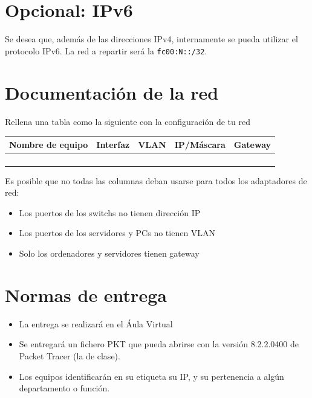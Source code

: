 \section{Opcional: IPv6}
Se desea que, además de las direcciones IPv4, internamente se pueda utilizar el protocolo IPv6. La red a repartir será la \texttt{fc00:N::/32}.

\section{Documentación de la red}
Rellena una tabla como la siguiente con la configuración de tu red

\begin{center}
  \begin{tabular}{|c|c|c|c|c|}
    \hline
    Nombre de equipo & Interfaz & VLAN & IP/Máscara & Gateway\\
    \hline
                     & & & & \\
                     & & & & \\
                     & & & & \\
                     & & & & \\
    \hline
  \end{tabular}
\end{center}

Es posible que no todas las columnas deban usarse para todos los adaptadores de red:
\begin{itemize}
\item Los puertos de los switchs no tienen dirección IP
\item Los puertos de los servidores y PCs no tienen VLAN
\item Solo los ordenadores y servidores tienen gateway
  
\end{itemize}

\section{Normas de entrega}
\begin{itemize}
  
\item La entrega se realizará en el Áula Virtual
\item Se entregará un fichero PKT que pueda abrirse con la versión 8.2.2.0400 de Packet Tracer (la de clase).
\item Los equipos identificarán en su etiqueta su IP, y su pertenencia a algún departamento o función.
\end{itemize}

